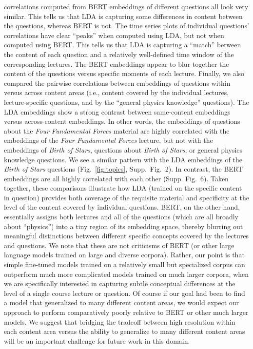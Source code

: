 \documentclass[10pt]{article}
\newcommand{\topicWeights}{2}
\newcommand{\ldaVsBERT}{6}
\begin{document}
correlations computed from BERT embeddings of different questions all look very
similar. This tells us that LDA is capturing some differences in content
between the questions, whereas BERT is not. The time series plots of individual
questions' correlations have clear ``peaks'' when computed using LDA, but not
when computed using BERT. This tells us that LDA is capturing a ``match''
between the content of each question and a relatively well-defined time window
of the corresponding lectures. The BERT embeddings appear to blur together the
content of the questions versus specific moments of each lecture. Finally, we
also compared the pairwise correlations between embeddings of questions within
versus across content areas (i.e., content covered by the individual lectures,
lecture-specific questions, and by the ``general physics knowledge''
questions). The LDA embeddings show a strong contrast between same-content
embeddings versus across-content embeddings. In other words, the embeddings of
questions about the \textit{Four Fundamental Forces} material are highly
correlated with the embeddings of the \textit{Four Fundamental Forces} lecture,
but not with the embeddings of \textit{Birth of Stars}, questions about
\textit{Birth of Stars}, or general physics knowledge questions. We see a
similar pattern with the LDA embeddings of the \textit{Birth of Stars}
questions (Fig.~\ref{fig:topics}, Supp.~Fig.~\topicWeights). In contrast, the
BERT embeddings are all highly correlated with each other (Supp.
Fig.~\ldaVsBERT). Taken together, these comparisons illustrate how LDA (trained
on the specific content in question) provides both coverage of the requisite
material and specificity at the level of the content covered by individual
questions. BERT, on the other hand, essentially assigns both lectures and all
of the questions (which are all broadly about ``physics'') into a tiny region
of its embedding space, thereby blurring out meaningful distinctions between
different specific concepts covered by the lectures and questions. We note that
these are not criticisms of BERT (or other large language models trained on
large and diverse corpora). Rather, our point is that simple fine-tuned models
trained on a relatively small but specialized corpus can outperform much more
complicated models trained on much larger corpora, when we are specifically
interested in capturing subtle conceptual differences at the level of a single
course lecture or question. Of course if our goal had been to find a model that
generalized to many different content areas, we would expect our approach to
perform comparatively poorly relative to BERT or other much larger models. We
suggest that bridging the tradeoff between high resolution within each content
area versus the ability to generalize to many different content areas will be
an important challenge for future work in this domain.
\end{document}

